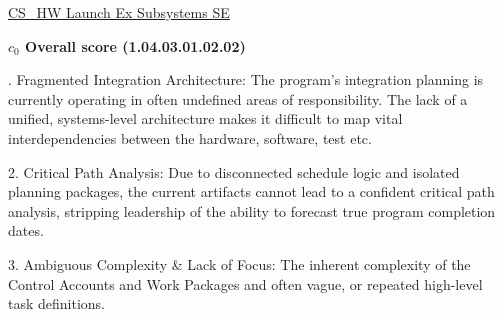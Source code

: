% 


\begin{frame}{\href{run:../local/source-docs/1.04.03.01.02.02.pdf}{CS\_HW Launch Ex Subsystems SE}}
\centering
{}
\par
\vspace{0.75em}
\textbf{\small{\(c_0\) Overall score {\tiny (1.04.03.01.02.02)}}}\\\par
\vspace{0.5em}
\begin{minipage}{0.85\textwidth}
\raggedright
\fontsize{7}{9}. Fragmented Integration Architecture: The program's integration planning is currently operating in often undefined areas of responsibility. The lack of a unified, systems-level architecture makes it difficult to map vital interdependencies between the hardware, software, test etc.\par\vspace{0.5em}2. Critical Path Analysis: Due to disconnected schedule logic and isolated planning packages, the current artifacts cannot lead to a confident critical path analysis, stripping leadership of the ability to forecast true program completion dates.\par\vspace{0.5em}3. Ambiguous Complexity \& Lack of Focus: The inherent complexity of the Control Accounts and Work Packages and often vague, or repeated high-level task definitions.\par
\end{minipage}
\end{frame}
